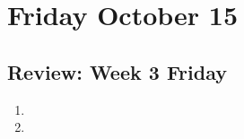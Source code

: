 \section*{Friday October 15}

\newpage
\newpage

\newpage


\newpage
\subsection*{Review: Week 3 Friday}
\begin{enumerate}
    \item 
    \item 
\end{enumerate}

